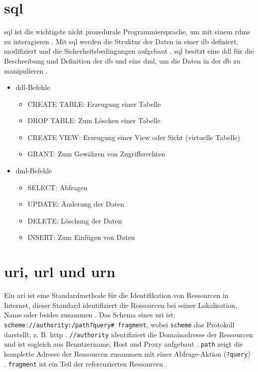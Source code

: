 \renewcommand{\cleardoublepage}{}
\renewcommand{\clearpage}{}
\clearpage

\chapter{\acs{sql}} \label{sec:sql}

\acf{sql} ist die wichtigste nicht prozedurale Programmiersprache, um mit einem \ac{rdms} zu interagieren \cite{sqlpost}. Mit \ac{sql} werden die Struktur der Daten in einer \ac{db} definiert, modifiziert und die Sicherheitsbedingungen aufgebaut \cite{dbsql}. \ac{sql} besitzt eine \ac{ddl} für die Beschreibung und Definition der \ac{db} und eine \ac{dml}, um die Daten in der \ac{db} zu manipulieren \cite{sqlpost, dbsql}.

\begin{itemize}
	\item \ac{ddl}-Befehle
	\begin{itemize}
		\item CREATE TABLE: Erzeugung einer Tabelle
		\item DROP TABLE: Zum Löschen einer Tabelle
		\item CREATE VIEW: Erzeugung einer View oder Sicht (virtuelle Tabelle)
		\item GRANT: Zum Gewähren von Zugriffsrechten
	\end{itemize}
	\item \ac{dml}-Befehle
	\begin{itemize}
		\item SELECT: Abfragen
		\item UPDATE: Änderung der Daten
		\item DELETE: Löschung der Daten
		\item INSERT: Zum Einfügen von Daten
	\end{itemize}
\end{itemize}

\chapter{\acs{uri}, \acs{url} und \acs{urn}} \label{sec:uri}

Ein \acf{uri} ist eine Standardmethode für die Identifikation von Ressourcen in Internet, dieser Standard identifiziert die Ressourcen bei seiner Lokalisation, Name oder beides zusammen \cite{uribibdiff}. Das Schema eines \ac{uri} ist: \texttt{scheme://authority:/path?query\# fragment}, wobei \texttt{scheme} das Protokoll darstellt, z. B. \glqq \ac{http}\grqq{} \cite{uribibdiff, uribibdiff2}. \texttt{//authority} identifiziert die Domainadresse der Ressourcen und ist sogleich aus Benutzername, Host und Proxy aufgebaut \cite{uribibdiff, uribibdiff3}. \texttt{path} zeigt die komplette Adresse der Ressourcen zusammen mit einer Abfrage-Aktion (\texttt{?query}) \cite{uribibdiff2}. \texttt{fragment} ist ein Teil der referenzierten Ressourcen \cite{uribibdiff}.

